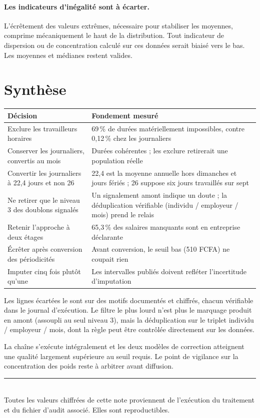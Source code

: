 \documentclass[11pt,a4paper]{article}
\begin{document}
\paragraph{Les indicateurs d'inégalité sont à écarter.} L'écrêtement des
valeurs extrêmes, nécessaire pour stabiliser les moyennes, comprime
mécaniquement le haut de la distribution. Tout indicateur de dispersion ou
de concentration calculé sur ces données serait biaisé vers le bas.
Les moyennes et médianes restent valides.

\section{Synthèse}

\begin{center}
\begin{tabular}{p{}p{}}
\toprule
\textbf{Décision} & \textbf{Fondement mesuré} \\
\midrule
Exclure les travailleurs horaires
& 69\,\% de durées matériellement impossibles, contre 0,12\,\% chez les journaliers \\[0.25cm]
Conserver les journaliers, convertis au mois
& Durées cohérentes ; les exclure retirerait une population réelle \\[0.25cm]
Convertir les journaliers à 22,4 jours et non 26
& 22,4 est la moyenne annuelle hors dimanches et jours fériés ; 26 suppose six jours travaillés sur sept \\[0.25cm]
Ne retirer que le niveau 3 des doublons signalés
& Un signalement amont indique un doute ; la déduplication vérifiable (individu / employeur / mois) prend le relais \\[0.25cm]
Retenir l'approche à deux étages
& 65,3\,\% des salaires manquants sont en entreprise déclarante \\[0.25cm]
Écrêter après conversion des périodicités
& Avant conversion, le seuil bas (\num{510} FCFA) ne coupait rien \\[0.25cm]
Imputer cinq fois plutôt qu'une
& Les intervalles publiés doivent refléter l'incertitude d'imputation \\
\bottomrule
\end{tabular}
\end{center}

\vspace{0.6cm}

\begin{retenir}
Les lignes écartées le sont sur des motifs documentés et chiffrés, chacun
vérifiable dans le journal d'exécution. Le filtre le plus lourd n'est plus
le marquage produit en amont (assoupli au seul niveau 3), mais la
déduplication sur le triplet individu / employeur / mois, dont la règle
peut être contrôlée directement sur les données.

La chaîne s'exécute intégralement et les deux modèles de correction
atteignent une qualité largement supérieure au seuil requis. Le point de
vigilance sur la concentration des poids reste à arbitrer avant
diffusion.
\end{retenir}

\vfill
\noindent\rule{\textwidth}{0.4pt}\\
{\footnotesize Toutes les valeurs chiffrées de cette note proviennent de
l'exécution du traitement et du fichier d'audit associé. Elles sont
reproductibles.}
\end{document}
